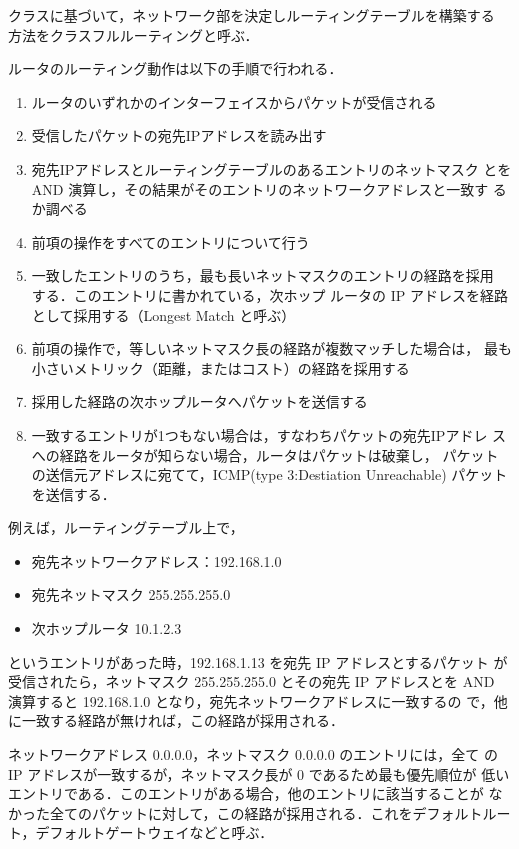 クラスに基づいて，ネットワーク部を決定しルーティングテーブルを構築する
方法をクラスフルルーティングと呼ぶ．

ルータのルーティング動作は以下の手順で行われる．

\begin{enumerate}
\item ルータのいずれかのインターフェイスからパケットが受信される
\item 受信したパケットの宛先IPアドレスを読み出す
\item 宛先IPアドレスとルーティングテーブルのあるエントリのネットマスク
  とを AND 演算し，その結果がそのエントリのネットワークアドレスと一致す
  るか調べる
\item 前項の操作をすべてのエントリについて行う
\item 一致したエントリのうち，最も長いネットマスクのエントリの経路を採用
      する．このエントリに書かれている，次ホップ
      ルータの IP アドレスを経路として採用する（Longest Match と呼ぶ）
\item 前項の操作で，等しいネットマスク長の経路が複数マッチした場合は，
  最も小さいメトリック（距離，またはコスト）の経路を採用する
\item 採用した経路の次ホップルータへパケットを送信する
\item 一致するエントリが1つもない場合は，すなわちパケットの宛先IPアドレ
      スへの経路をルータが知らない場合，ルータはパケットは破棄し，
      パケットの送信元アドレスに宛てて，ICMP(type 3:Destiation
      Unreachable) パケットを送信する．
\end{enumerate}

例えば，ルーティングテーブル上で，
\begin{itemize}
\item 宛先ネットワークアドレス：192.168.1.0
\item 宛先ネットマスク 255.255.255.0
\item 次ホップルータ 10.1.2.3
\end{itemize}
というエントリがあった時，192.168.1.13 を宛先 IP アドレスとするパケット
が受信されたら，ネットマスク 255.255.255.0 とその宛先 IP アドレスとを
AND 演算すると 192.168.1.0 となり，宛先ネットワークアドレスに一致するの
で，他に一致する経路が無ければ，この経路が採用される．

ネットワークアドレス 0.0.0.0，ネットマスク 0.0.0.0 のエントリには，全て
の IP アドレスが一致するが，ネットマスク長が 0 であるため最も優先順位が
低いエントリである．このエントリがある場合，他のエントリに該当することが
なかった全てのパケットに対して，この経路が採用される．これをデフォルトルー
ト，デフォルトゲートウェイなどと呼ぶ．

